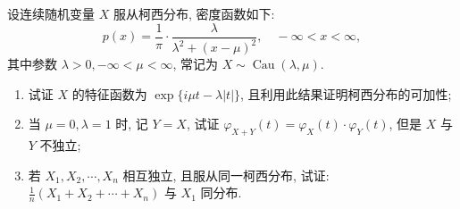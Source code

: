 \documentclass[../main.tex]{subfiles}
\begin{document}
\begin{exercise}{}{}
设连续随机变量 $X$ 服从柯西分布, 密度函数如下:
$$
p(x) = \frac{1}{\pi} \cdot \frac{\lambda}{\lambda^2 + (x-\mu)^2}, \quad -\infty < x < \infty,
$$
其中参数 $\lambda > 0, -\infty < \mu < \infty$, 常记为 $X \sim \operatorname{Cau}(\lambda, \mu)$.

\begin{enumerate}
    \item 试证 $X$ 的特征函数为 $\exp\{i\mu t - \lambda|t|\}$, 且利用此结果证明柯西分布的可加性;

    \item 当 $\mu=0, \lambda=1$ 时, 记 $Y=X$, 试证 $\varphi_{X+Y}(t) = \varphi_X(t) \cdot \varphi_Y(t)$, 但是 $X$ 与 $Y$ 不独立;

    \item 若 $X_1, X_2, \cdots, X_n$ 相互独立, 且服从同一柯西分布, 试证: $\frac{1}{n}(X_1 + X_2 + \cdots + X_n)$ 与 $X_1$ 同分布.
\end{enumerate}
\end{exercise}
\end{document}
